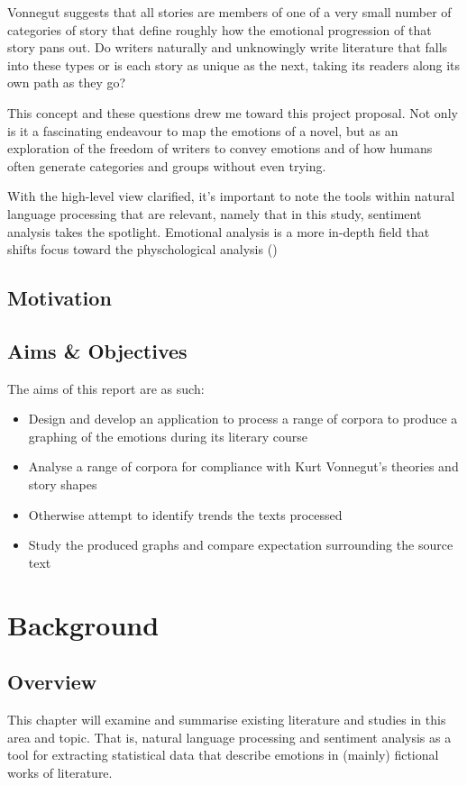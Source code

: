 \documentclass{article}
\begin{document}
        Vonnegut suggests that all stories are members of one of a very small number of categories of story that define roughly how the emotional progression of that story pans out. Do writers naturally and unknowingly write literature that falls into these types or is each story as unique as the next, taking its readers along its own path as they go?

        This concept and these questions drew me toward this project proposal. Not only is it a fascinating endeavour to map the emotions of a novel, but as an exploration of the freedom of writers to convey emotions and of how humans often generate categories and groups without even trying.

        With the high-level view clarified, it's important to note the tools within natural language processing that are relevant, namely that in this study, sentiment analysis takes the spotlight. Emotional analysis is a more in-depth field that shifts focus toward the physchological analysis (\cite{sentimentVsEmotionAnalysis})
    \subsection{Motivation}
    \subsection{Aims \& Objectives}
        The aims of this report are as such:
        \begin{itemize}
            \item Design and develop an application to process a range of corpora to produce a graphing of the emotions during its literary course
            \item Analyse a range of corpora for compliance with Kurt Vonnegut’s theories and story shapes
            \item Otherwise attempt to identify trends the texts processed
            \item Study the produced graphs and compare expectation surrounding the source text
        \end{itemize}
\newpage
\section{Background}
    \subsection{Overview}
        This chapter will examine and summarise existing literature and studies in this area and topic. That is, natural language processing and sentiment analysis as a tool for extracting statistical data that describe emotions in (mainly) fictional works of literature.
\end{document}

